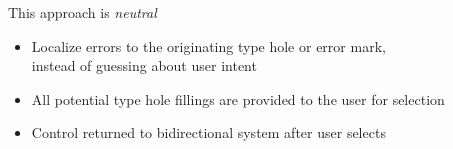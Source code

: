 \begin{frame}
  This approach is \emph{neutral} \\[1em]

  \pause
  \begin{itemize}
    \item Localize errors to the originating type hole or error mark, \\
      instead of guessing about user intent

      \pause
    \item All potential type hole fillings are provided to the user for selection

      \pause
    \item Control returned to bidirectional system after user selects
  \end{itemize}

\end{frame}
